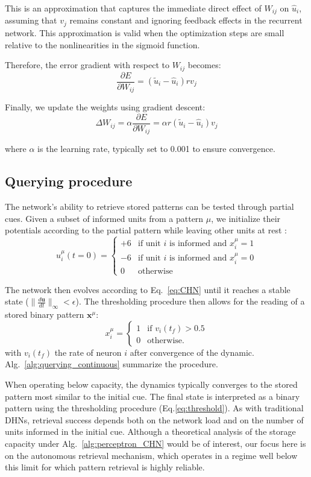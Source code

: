 \documentclass[10pt,letterpaper]{article}
\begin{document}
This is an approximation that captures the immediate direct effect of $W_{ij}$ on $\hat{u}_i$, assuming that $v_j$ remains constant and ignoring feedback effects in the recurrent network. This approximation is valid when the optimization steps are small relative to the nonlinearities in the sigmoid function.

Therefore, the error gradient with respect to $W_{ij}$ becomes:
\[\frac{\partial E}{\partial W_{ij}} = (\tilde{u}_i - \hat{u}_i)rv_j\]

Finally, we update the weights using gradient descent:
\[\Delta W_{ij} = \alpha \frac{\partial E}{\partial W_{ij}} = \alpha r(\tilde{u}_i - \hat{u}_i)v_j\]

where $\alpha$ is the learning rate, typically set to 0.001 to ensure convergence.

\subsection{Querying procedure}
\label{app:querying}

The network's ability to retrieve stored patterns can be tested through partial cues. Given a subset of informed units from a pattern $\mu$, we initialize their potentials according to the partial pattern while leaving other units at rest : 
\[
u^{\mu}_i(t=0) = 
\begin{cases} 
+6 & \text{if unit $i$ is informed and } x^{\mu}_i = 1 \\
-6 & \text{if unit $i$ is informed and } x^{\mu}_i = 0 \\
0 & \text{otherwise}
\end{cases}
\]

The network then evolves according to Eq.~\ref{eq:CHN} until it reaches a stable state ($\|\frac{d\textbf{u}}{dt}\|_{\infty} < \epsilon$).
The thresholding procedure then allows for the reading of a stored binary pattern $\mathbf{x}^{\mu}$:
\[
x^{\mu}_i = 
\begin{cases} 
1 & \text{if } v_i(t_f)>0.5 \\
0 & \text{otherwise.}
\end{cases}
\]
with $v_i(t_{f})$ the rate of neuron $i$ after convergence of the dynamic. Alg.~\ref{alg:querying_continuous} summarize the procedure.

When operating below capacity, the dynamics typically converges to the stored pattern most similar to the initial cue. The final state is interpreted as a binary pattern using the thresholding procedure (Eq.\ref{eq:threshold}). As with traditional DHNs, retrieval success depends both on the network load and on the number of units informed in the initial cue. Although a theoretical analysis of the storage capacity under Alg.~\ref{alg:perceptron_CHN} would be of interest, our focus here is on the autonomous retrieval mechanism, which operates in a regime well below this limit for which pattern retrieval is highly reliable.
\end{document}
